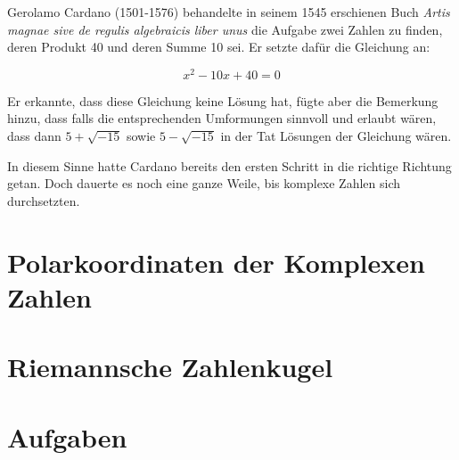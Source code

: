 Gerolamo Cardano (1501-1576) behandelte in seinem 1545 erschienen Buch \textit{Artis magnae sive de regulis algebraicis liber unus} die Aufgabe zwei Zahlen zu finden, deren Produkt 40 und deren Summe 10 sei. Er setzte dafür die Gleichung an:

\[ x^2-10x+40=0 \]

Er erkannte, dass diese Gleichung keine Lösung hat, fügte aber die Bemerkung hinzu, dass falls die entsprechenden Umformungen sinnvoll und erlaubt wären, dass dann $5+\sqrt{-15}$ sowie $5-\sqrt{-15} $ in der Tat Lösungen der Gleichung wären. 

In diesem Sinne hatte Cardano bereits den ersten Schritt in die richtige Richtung getan. Doch dauerte es noch eine ganze Weile, bis komplexe Zahlen sich durchsetzten.

\section{Polarkoordinaten der Komplexen Zahlen}

\section{Riemannsche Zahlenkugel}


\section{Aufgaben}

